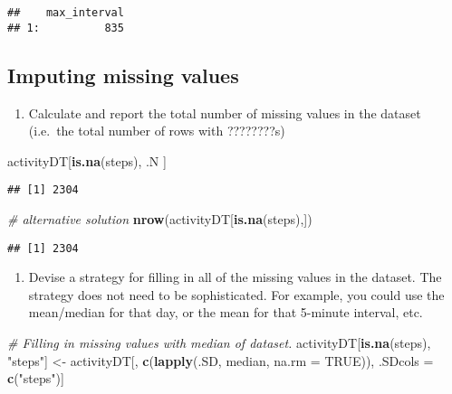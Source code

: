 \documentclass[]{article}
\newenvironment{Shaded}{\begin{snugshade}}{\end{snugshade}}
\newcommand{\KeywordTok}[1]{\textcolor[rgb]{0.13,0.29,0.53}{\textbf{#1}}}
\newcommand{\DataTypeTok}[1]{\textcolor[rgb]{0.13,0.29,0.53}{#1}}
\newcommand{\StringTok}[1]{\textcolor[rgb]{0.31,0.60,0.02}{#1}}
\newcommand{\CommentTok}[1]{\textcolor[rgb]{0.56,0.35,0.01}{\textit{#1}}}
\newcommand{\OtherTok}[1]{\textcolor[rgb]{0.56,0.35,0.01}{#1}}
\newcommand{\NormalTok}[1]{#1}
\providecommand{\tightlist}{%
  \setlength{\itemsep}{0pt}\setlength{\parskip}{0pt}}
\begin{document}
\begin{verbatim}
##    max_interval
## 1:          835
\end{verbatim}

\subsection{Imputing missing values}\label{imputing-missing-values}

\begin{enumerate}
\def\labelenumi{\arabic{enumi}.}
\tightlist
\item
  Calculate and report the total number of missing values in the dataset
  (i.e.~the total number of rows with ????????s)
\end{enumerate}

\begin{Shaded}
\begin{Highlighting}[]
\NormalTok{activityDT[}\KeywordTok{is.na}\NormalTok{(steps), .N ]}
\end{Highlighting}
\end{Shaded}

\begin{verbatim}
## [1] 2304
\end{verbatim}

\begin{Shaded}
\begin{Highlighting}[]
\CommentTok{# alternative solution}
\KeywordTok{nrow}\NormalTok{(activityDT[}\KeywordTok{is.na}\NormalTok{(steps),])}
\end{Highlighting}
\end{Shaded}

\begin{verbatim}
## [1] 2304
\end{verbatim}

\begin{enumerate}
\def\labelenumi{\arabic{enumi}.}
\setcounter{enumi}{1}
\tightlist
\item
  Devise a strategy for filling in all of the missing values in the
  dataset. The strategy does not need to be sophisticated. For example,
  you could use the mean/median for that day, or the mean for that
  5-minute interval, etc.
\end{enumerate}

\begin{Shaded}
\begin{Highlighting}[]
\CommentTok{# Filling in missing values with median of dataset. }
\NormalTok{activityDT[}\KeywordTok{is.na}\NormalTok{(steps), }\StringTok{"steps"}\NormalTok{] <-}\StringTok{ }\NormalTok{activityDT[, }\KeywordTok{c}\NormalTok{(}\KeywordTok{lapply}\NormalTok{(.SD, median, }\DataTypeTok{na.rm =} \OtherTok{TRUE}\NormalTok{)), .SDcols =}\StringTok{ }\KeywordTok{c}\NormalTok{(}\StringTok{"steps"}\NormalTok{)]}
\end{Highlighting}
\end{Shaded}
\end{document}
